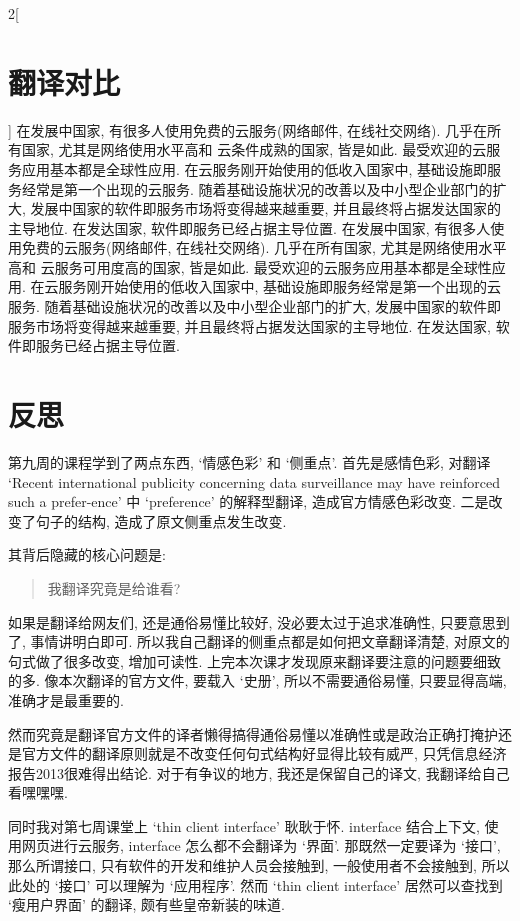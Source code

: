 \documentclass[a4paper, UTF8, 12pt]{article}
\begin{document}
\begin{paracol}{2}[\section{翻译对比}]
    \switchcolumn*
    在发展中国家, 有很多人使用免费的云服务(网络邮件, 在线社交网络). 几乎在所有国家, 尤其是网络使用水平高和{\color{red} 云条件成熟}的国家, 皆是如此. 最受欢迎的云服务应用基本都是全球性应用. 在云服务刚开始使用的低收入国家中, 基础设施即服务经常是第一个出现的云服务. 随着基础设施状况的改善以及中小型企业部门的扩大, 发展中国家的软件即服务市场将变得越来越重要, 并且最终将占据发达国家的主导地位. 在发达国家, 软件即服务已经占据主导位置.
    \switchcolumn
    在发展中国家, 有很多人使用免费的云服务(网络邮件, 在线社交网络). 几乎在所有国家, 尤其是网络使用水平高和{\color{red} 云服务可用度高}的国家, 皆是如此. 最受欢迎的云服务应用基本都是全球性应用. 在云服务刚开始使用的低收入国家中, 基础设施即服务经常是第一个出现的云服务. 随着基础设施状况的改善以及中小型企业部门的扩大, 发展中国家的软件即服务市场将变得越来越重要, 并且最终将占据发达国家的主导地位. 在发达国家, 软件即服务已经占据主导位置.

\end{paracol}

\section{反思}
第九周的课程学到了两点东西, `情感色彩' 和 `侧重点'. 
首先是感情色彩, 对翻译 `Recent international publicity concerning data surveillance may have reinforced such a prefer-ence' 中 `preference' 的解释型翻译, 造成官方情感色彩改变. 二是改变了句子的结构, 造成了原文侧重点发生改变.

其背后隐藏的核心问题是:
\begin{quote}
    我翻译究竟是给谁看?
\end{quote}
    
如果是翻译给网友们, 还是通俗易懂比较好, 没必要太过于追求准确性, 只要意思到了, 事情讲明白即可. 所以我自己翻译的侧重点都是如何把文章翻译清楚, 对原文的句式做了很多改变, 增加可读性. 上完本次课才发现原来翻译要注意的问题要细致的多. 像本次翻译的官方文件, 要载入 `史册', 所以不需要通俗易懂, 只要显得高端, 准确才是最重要的. 

然而究竟是翻译官方文件的译者懒得搞得通俗易懂以准确性或是政治正确打掩护还是官方文件的翻译原则就是不改变任何句式结构好显得比较有威严, 只凭信息经济报告2013很难得出结论. 对于有争议的地方, 我还是保留自己的译文, 我翻译给自己看嘿嘿嘿.

同时我对第七周课堂上 `thin client interface' 耿耿于怀. interface 结合上下文, 使用网页进行云服务, interface 怎么都不会翻译为 `界面'. 那既然一定要译为 `接口', 那么所谓接口, 只有软件的开发和维护人员会接触到, 一般使用者不会接触到, 所以此处的 `接口' 可以理解为 `应用程序'. 然而 `thin client interface' 居然可以查找到 `瘦用户界面' 的翻译, 颇有些皇帝新装的味道.
\end{document}
